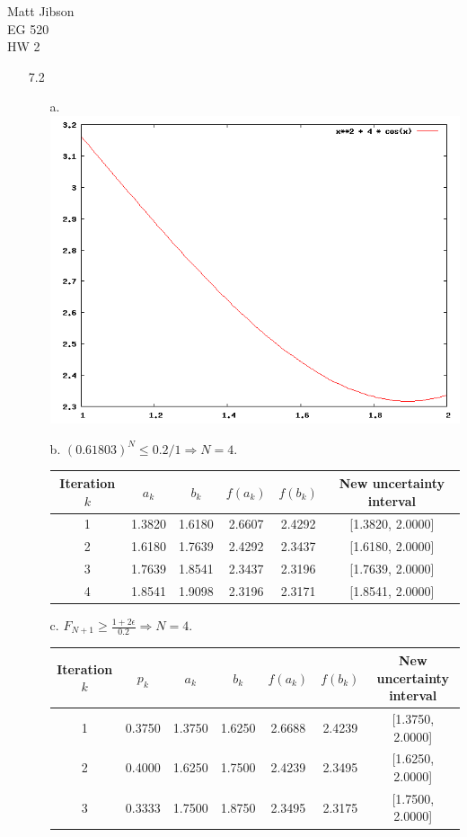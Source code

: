 \documentclass{article}
\begin{document}
\begin{flushright}
Matt Jibson \\
EG 520 \\
HW 2
\end{flushright}

\begin{itemize}
	\item[7.2]
		\begin{itemize}
			\item[a.] \ \\ \includegraphics[width=0.5\linewidth]{72a.png}
			\item[b.] $(0.61803)^N \le 0.2/1 \Rightarrow N = 4$. \\
				\begin{tabular}{cccccc}
					\hline
					Iteration $k$ & $a_k$ & $b_k$ & $f(a_k)$ & $f(b_k)$ & New uncertainty interval \\
					\hline
					1 & 1.3820 & 1.6180 & 2.6607 & 2.4292 & [1.3820, 2.0000] \\
					2 & 1.6180 & 1.7639 & 2.4292 & 2.3437 & [1.6180, 2.0000] \\
					3 & 1.7639 & 1.8541 & 2.3437 & 2.3196 & [1.7639, 2.0000] \\
					4 & 1.8541 & 1.9098 & 2.3196 & 2.3171 & [1.8541, 2.0000] \\
					\hline
				\end{tabular}
			\item[c.] $F_{N + 1} \ge \frac{1 + 2 \epsilon}{0.2} \Rightarrow N = 4$. \\
				\begin{tabular}{ccccccc}
					\hline
					Iteration $k$ & $p_k$ & $a_k$ & $b_k$ & $f(a_k)$ & $f(b_k)$ & New uncertainty interval \\
					\hline
					1 & 0.3750 & 1.3750 & 1.6250 & 2.6688 & 2.4239 & [1.3750, 2.0000] \\
					2 & 0.4000 & 1.6250 & 1.7500 & 2.4239 & 2.3495 & [1.6250, 2.0000] \\
					3 & 0.3333 & 1.7500 & 1.8750 & 2.3495 & 2.3175 & [1.7500, 2.0000] \\

\end{tabular}
\end{itemize}
\end{itemize}
\end{document}

